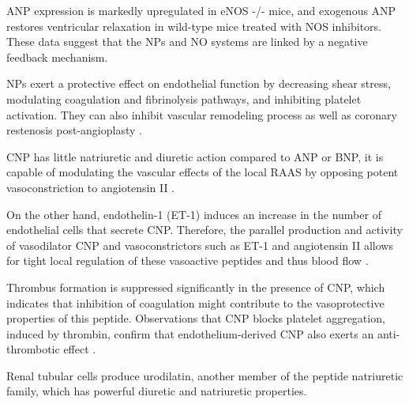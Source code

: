 \documentclass[14pt,a4paper,onecolumn]{extarticle}
\begin{document}
ANP expression is markedly upregulated in eNOS -/- mice, and exogenous ANP restores ventricular relaxation in wild-type mice treated with NOS inhibitors. These data suggest that the NPs and NO systems are linked by a negative feedback mechanism.  \citep{118}

NPs exert a protective effect on endothelial function by decreasing shear stress, modulating coagulation and fibrinolysis pathways, and inhibiting platelet activation. They can also inhibit vascular remodeling process as well as coronary restenosis post-angioplasty \citep{89}.

CNP has little natriuretic and diuretic action compared to ANP or BNP, it is capable of modulating the vascular effects of the local RAAS by opposing potent vasoconstriction to angiotensin II \citep{269}.

On the other hand, endothelin-1 (ET-1) induces an increase in the number of endothelial cells that secrete CNP. Therefore, the parallel production and activity of vasodilator CNP and vasoconstrictors such as ET-1 and angiotensin II allows for tight local regulation of these vasoactive peptides and thus blood flow \citep{279}.

Thrombus formation is suppressed significantly in the presence of CNP, which indicates that inhibition of coagulation might contribute to the vasoprotective properties of this peptide. Observations that CNP blocks platelet aggregation, induced by thrombin, confirm that endothelium-derived CNP also exerts an anti-thrombotic effect \citep{267}. %

Renal tubular cells produce urodilatin, another member of the peptide natriuretic family, which has powerful diuretic and natriuretic properties. \citep{100}

\end{document}
